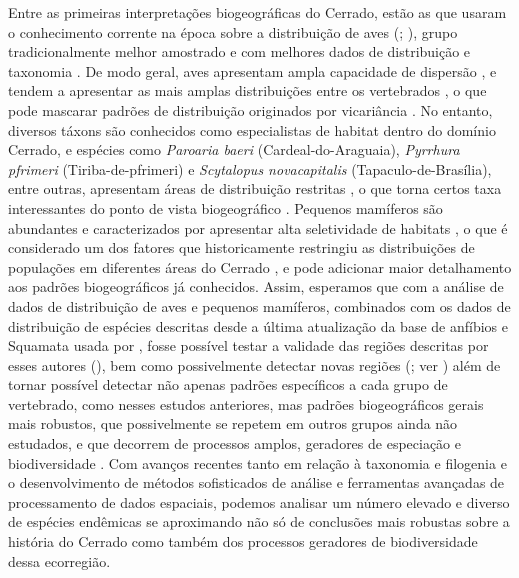\documentclass[12pt,openright,oneside,a4paper,english]{abntex2}
\begin{document}
Entre as primeiras interpretações biogeográficas do Cerrado, estão as que usaram o conhecimento corrente na época sobre a distribuição de aves (\citealp{Silva1995, Silva1997}; \citealp[ver, porém][]{Vanzolini1963, Muller1979}), grupo tradicionalmente melhor amostrado e com melhores dados de distribuição e taxonomia \citep{Brown1995}. De modo geral, aves apresentam ampla capacidade de dispersão \citep{Sick1997}, e tendem a apresentar as mais amplas distribuições entre os vertebrados \citep{Gaston1996}, o que pode mascarar padrões de distribuição originados por vicariância \citep{Hausdorf2002}. No entanto, diversos táxons são conhecidos como especialistas de habitat dentro do domínio Cerrado, e espécies como \textit{Paroaria baeri} (Cardeal-do-Araguaia), \textit{Pyrrhura pfrimeri} (Tiriba-de-pfrimeri) e \textit{Scytalopus novacapitalis} (Tapaculo-de-Brasília), entre outras, apresentam áreas de distribuição restritas \citep{Gwynne2010}, o que torna certos taxa interessantes do ponto de vista biogeográfico \citep{Silva1997}. Pequenos mamíferos são abundantes e caracterizados por apresentar alta seletividade de habitats \citep{Carmignotto2011}, o que é considerado um dos fatores que historicamente restringiu as distribuições de populações em diferentes áreas do Cerrado \citep{Carmignotto2022}, e pode adicionar maior detalhamento aos padrões biogeográficos já conhecidos. Assim, esperamos que com a análise de dados de distribuição de aves e pequenos mamíferos, combinados com os dados de distribuição de espécies descritas desde a última atualização da base de anfíbios e Squamata usada por \citet{Azevedo2016}, fosse possível testar a validade das regiões descritas por esses autores (\citealp[e.g][]{Silva1997, Nogueira2011, Azevedo2016}), bem como possivelmente detectar novas regiões (\citealp{Carvalho2016}; ver ) além de tornar possível detectar não apenas padrões específicos a cada grupo de vertebrado, como nesses estudos anteriores, mas padrões biogeográficos gerais mais robustos, que possivelmente se repetem em outros grupos ainda não estudados, e que decorrem de processos amplos, geradores de especiação e biodiversidade \citep{Wiley1988, Morrone2002}. Com avanços recentes tanto em relação à taxonomia e filogenia e o desenvolvimento de métodos sofisticados de análise e ferramentas avançadas de processamento de dados espaciais, podemos analisar um número elevado e diverso de espécies endêmicas se aproximando não só de conclusões mais robustas sobre a história do Cerrado como também dos processos geradores de biodiversidade dessa ecorregião.
\end{document}

